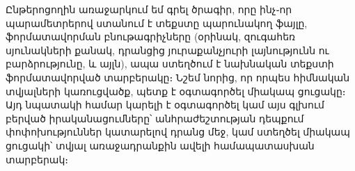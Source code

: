 Ընթերոցողին առաջարկում եմ գրել ծրագիր, որը ինչ֊որ պարամետրերով 
ստանում է տեքստը պարունակող ֆայլը, ֆորմատավորման բնութագրիչները 
(օրինակ, զուգահեռ սյունակների քանակ, դրանցից յուրաքանչյուրի 
լայնությունն ու բարձրությունը, և այլն), ապա ստեղծում է նախնական
տեքստի ֆորմատավորված տարբերակը։ Նշեմ նորից, որ որպես հիմնական
տվյալների կառուցվածք, պետք է օգտագործել միակապ ցուցակը։ Այդ 
նպատակի համար կարելի է օգտագործել կամ այս գլխում բերված 
իրականացումները՝ անհրաժեշտության դեպքում փոփոխություններ կատարելով
դրանց մեջ, կամ ստեղծել միակապ ցուցակի՝ տվյալ առաջադրանքին ավելի 
համապատասխան տարբերակ։



\nwenddocs{}
